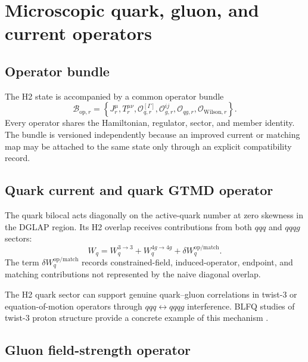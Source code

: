 \documentclass[11pt]{article}
\newcommand{\cO}{\mathcal O}
\newcommand{\cB}{\mathcal B}
\begin{document}
\section{Microscopic quark, gluon, and current operators}

\subsection{Operator bundle}

The H2 state is accompanied by a common operator bundle
\begin{equation}
 \cB_{\mathrm{op},r}
 =
 \left
 \{
 J_r^\mu,
 T_r^{\mu\nu},
 \cO_{q,r}^{[\Gamma]},
 \cO_{g,r}^{ij},
 \cO_{qg,r},
 \cO_{\mathrm{Wilson},r}
 \right\}.
 \label{eq:operator-bundle}
\end{equation}
Every operator shares the Hamiltonian, regulator, sector, and member identity.
The bundle is versioned independently because an improved current or matching
map may be attached to the same state only through an explicit compatibility
record.

\subsection{Quark current and quark GTMD operator}

The quark bilocal acts diagonally on the active-quark number at zero skewness
in the DGLAP region.  Its H2 overlap receives contributions from both
\(qqq\) and \(qqqg\) sectors:
\begin{equation}
 W_q
 =
 W_q^{3\to3}
 +W_q^{4g\to4g}
 +\delta W_q^{\mathrm{op/match}}.
 \label{eq:quark-h2-overlap}
\end{equation}
The term \(\delta W_q^{\mathrm{op/match}}\) records constrained-field,
induced-operator, endpoint, and matching contributions not represented by the
naive diagonal overlap.

The H2 quark sector can support genuine quark--gluon correlations in twist-3
or equation-of-motion operators through \(qqq\leftrightarrow qqqg\)
interference.  BLFQ studies of twist-3 proton structure provide a concrete
example of this mechanism \cite{Zhu2024}.

\subsection{Gluon field-strength operator}
\end{document}
